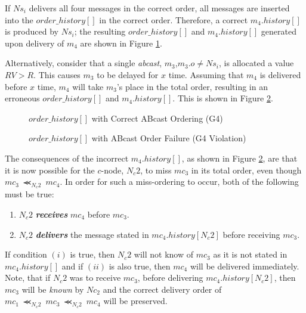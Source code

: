     If $Ns_i$ delivers all four messages in the correct order, all messages are inserted into the $order\_history[]$ in the correct order.  Therefore, a correct $m_4.history[]$ is produced by $Ns_i$; the resulting $order\_history[]$ and $m_4.history[]$ generated upon delivery of $m_4$ are shown in Figure \ref{fig:correct_ohistory_pscast}.  
    
    Alternatively, consider that a single \emph{abcast}, $m_3$,$m_3.o \neq Ns_i$, is allocated a value $RV > R$.  This causes $m_3$ to be delayed for $x$ time.  Assuming that $m_4$ is delivered before $x$ time, $m_4$ will take $m_3$'s place in the total order, resulting in an erroneous $order\_history[]$ and $m_4.history[]$.  This is shown in Figure \ref{fig:incorrect_ohistory_pscast}.  
    
    \begin{figure}[h] 
        \centering
         \caption[Order History with Correct \textsf{ABcast} Ordering (G4)]{$order\_history[]$ with Correct \textsf{ABcast} Ordering (G4)}
         \label{fig:correct_ohistory_pscast}
    \end{figure}    

    \begin{figure}[h] 
        \centering
         \caption[Order History with \textsf{ABcast} Order Failure (G4 Violation)]{$order\_history[]$ with \textsf{ABcast} Order Failure (G4 Violation)}
         \label{fig:incorrect_ohistory_pscast}
    \end{figure}  
    
    The consequences of the incorrect $m_4.history[]$, as shown in Figure \ref{fig:incorrect_ohistory_pscast}, are that it is now possible for the $c$-node, $N_c2$, to miss $mc_3$ in its total order, even though ${mc_3 \ \llcurly_{N_c2} \ mc_4}$.  In order for such a miss-ordering to occur, both of the following must be true:
    
    \begin{enumerate}[label=\roman*]
        \item $N_c2$ \textbf{\emph{receives}} $mc_4$ before $mc_3$.     
        
        \item $N_c2$ \textbf{\emph{delivers}} the message stated in $mc_4.history[N_c2]$ before receiving $mc_3$.  
    \end{enumerate}
    
    If condition $(i)$ is true, then $N_c2$ will not know of $mc_3$ as it is not stated in $mc_4.history[]$ and if $(ii)$ is also true, then $mc_4$ will be delivered immediately.  Note, that if $N_c2$ was to receive $mc_3$, before delivering $mc_4.history[N_c2]$, then $mc_3$ will be \emph{known} by $Nc_2$ and the correct delivery order of ${mc_1 \ \llcurly_{N_c2} \ mc_3 \ \llcurly_{N_c2} \ mc_4}$ will be preserved.  

